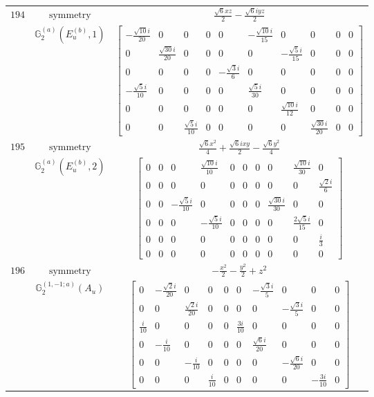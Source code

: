 \documentclass[fleqn,8pt,landscape]{jsarticle}
\begin{document}
\begin{longtable}{ccc}
$ 194 $ & $ \text{symmetry} $ & $ \frac{\sqrt{6} x z}{2} - \frac{\sqrt{6} i y z}{2} $ \\
$  $ & $ \mathbb{G}_{2}^{(a)}(E_{u}^{(b)},1) $ & $ \begin{bmatrix} - \frac{\sqrt{10} i}{20} & 0 & 0 & 0 & 0 & - \frac{\sqrt{10} i}{15} & 0 & 0 & 0 & 0 \\ 0 & \frac{\sqrt{30} i}{20} & 0 & 0 & 0 & 0 & - \frac{\sqrt{5} i}{15} & 0 & 0 & 0 \\ 0 & 0 & 0 & 0 & - \frac{\sqrt{3} i}{6} & 0 & 0 & 0 & 0 & 0 \\ - \frac{\sqrt{5} i}{10} & 0 & 0 & 0 & 0 & \frac{\sqrt{5} i}{30} & 0 & 0 & 0 & 0 \\ 0 & 0 & 0 & 0 & 0 & 0 & \frac{\sqrt{10} i}{12} & 0 & 0 & 0 \\ 0 & 0 & \frac{\sqrt{5} i}{10} & 0 & 0 & 0 & 0 & \frac{\sqrt{30} i}{20} & 0 & 0 \end{bmatrix} $ \\ \hline
$ 195 $ & $ \text{symmetry} $ & $ \frac{\sqrt{6} x^{2}}{4} + \frac{\sqrt{6} i x y}{2} - \frac{\sqrt{6} y^{2}}{4} $ \\
$  $ & $ \mathbb{G}_{2}^{(a)}(E_{u}^{(b)},2) $ & $ \begin{bmatrix} 0 & 0 & 0 & \frac{\sqrt{10} i}{10} & 0 & 0 & 0 & 0 & \frac{\sqrt{10} i}{30} & 0 \\ 0 & 0 & 0 & 0 & 0 & 0 & 0 & 0 & 0 & \frac{\sqrt{2} i}{6} \\ 0 & 0 & - \frac{\sqrt{5} i}{10} & 0 & 0 & 0 & 0 & \frac{\sqrt{30} i}{30} & 0 & 0 \\ 0 & 0 & 0 & - \frac{\sqrt{5} i}{10} & 0 & 0 & 0 & 0 & \frac{2 \sqrt{5} i}{15} & 0 \\ 0 & 0 & 0 & 0 & 0 & 0 & 0 & 0 & 0 & \frac{i}{3} \\ 0 & 0 & 0 & 0 & 0 & 0 & 0 & 0 & 0 & 0 \end{bmatrix} $ \\ \hline
$ 196 $ & $ \text{symmetry} $ & $ - \frac{x^{2}}{2} - \frac{y^{2}}{2} + z^{2} $ \\
$  $ & $ \mathbb{G}_{2}^{(1,-1;a)}(A_{u}) $ & $ \begin{bmatrix} 0 & - \frac{\sqrt{2} i}{20} & 0 & 0 & 0 & 0 & - \frac{\sqrt{3} i}{5} & 0 & 0 & 0 \\ 0 & 0 & \frac{\sqrt{2} i}{20} & 0 & 0 & 0 & 0 & - \frac{\sqrt{3} i}{5} & 0 & 0 \\ \frac{i}{10} & 0 & 0 & 0 & 0 & \frac{3 i}{10} & 0 & 0 & 0 & 0 \\ 0 & - \frac{i}{10} & 0 & 0 & 0 & 0 & \frac{\sqrt{6} i}{20} & 0 & 0 & 0 \\ 0 & 0 & - \frac{i}{10} & 0 & 0 & 0 & 0 & - \frac{\sqrt{6} i}{20} & 0 & 0 \\ 0 & 0 & 0 & \frac{i}{10} & 0 & 0 & 0 & 0 & - \frac{3 i}{10} & 0 \end{bmatrix} $ \\ \hline

\end{longtable}
\end{document}
